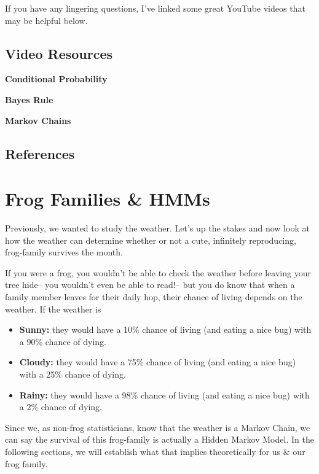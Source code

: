 \documentclass[
]{book}
\providecommand{\tightlist}{%
  \setlength{\itemsep}{0pt}\setlength{\parskip}{0pt}}
\begin{document}
If you have any lingering questions, I've linked some great YouTube videos that may be helpful below.

\hypertarget{video-resources}{%
\section*{Video Resources}\label{video-resources}}

\textbf{Conditional Probability}

\textbf{Bayes Rule}

\textbf{Markov Chains}

\hypertarget{references}{%
\section*{References}\label{references}}

\hypertarget{frog-families-hmms}{%
\chapter{Frog Families \& HMMs}\label{frog-families-hmms}}

Previously, we wanted to study the weather. Let's up the stakes and now look at how the weather can determine whether or not a cute, infinitely reproducing, frog-family survives the month.

If you were a frog, you wouldn't be able to check the weather before leaving your tree hide-- you wouldn't even be able to read!-- but you do know that when a family member leaves for their daily hop, their chance of living depends on the weather. If the weather is

\begin{itemize}
\tightlist
\item
  \textbf{Sunny:} they would have a 10\% chance of living (and eating a nice bug) with a 90\% chance of dying.
\item
  \textbf{Cloudy:} they would have a 75\% chance of living (and eating a nice bug) with a 25\% chance of dying.
\item
  \textbf{Rainy:} they would have a 98\% chance of living (and eating a nice bug) with a 2\% chance of dying.
\end{itemize}

Since we, as non-frog statisticians, know that the weather is a Markov Chain, we can say the survival of this frog-family is actually a Hidden Markov Model. In the following sections, we will establish what that implies theoretically for us \& our frog family.
\end{document}
